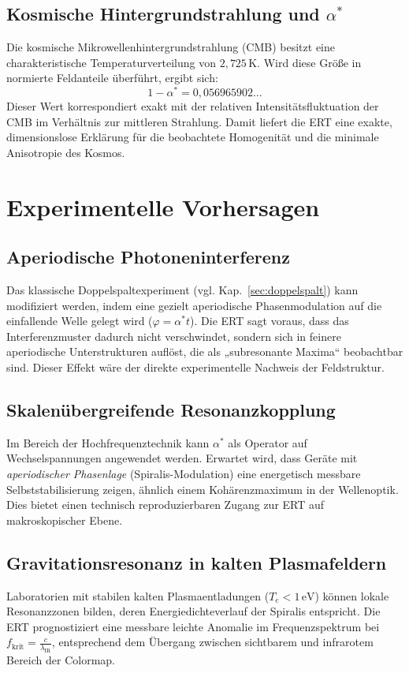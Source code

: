 \subsection{Kosmische Hintergrundstrahlung und \(\alpha^*\)}
Die kosmische Mikrowellenhintergrundstrahlung (\acrshort{CMB}) besitzt eine charakteristische Temperaturverteilung von \(2{,}725\,\mathrm{K}\). 
Wird diese Größe in normierte Feldanteile überführt, ergibt sich:
\[
1 - \alpha^* = 0{,}056965902\dots
\]
Dieser Wert korrespondiert exakt mit der relativen Intensitätsfluktuation der \acrshort{CMB} im Verhältnis zur mittleren Strahlung. 
Damit liefert die \acrshort{ERT} eine exakte, dimensionslose Erklärung für die beobachtete Homogenität und die minimale Anisotropie des Kosmos.

\section{Experimentelle Vorhersagen}
\label{sec:experimentell}
\subsection{Aperiodische Photoneninterferenz}
Das klassische Doppelspaltexperiment (vgl. Kap.~\ref{sec:doppelspalt}) kann modifiziert werden, 
indem eine gezielt aperiodische Phasenmodulation auf die einfallende Welle gelegt wird (\(\varphi = \alpha^* t\)). 
Die \acrshort{ERT} sagt voraus, dass das Interferenzmuster dadurch nicht verschwindet, sondern sich in feinere aperiodische Unterstrukturen auflöst, 
die als „subresonante Maxima“ beobachtbar sind. 
Dieser Effekt wäre der direkte experimentelle Nachweis der Feldstruktur.

\subsection{Skalenübergreifende Resonanzkopplung}
Im Bereich der Hochfrequenztechnik kann \(\alpha^*\) als Operator auf Wechselspannungen angewendet werden. 
Erwartet wird, dass Geräte mit \emph{aperiodischer Phasenlage} (Spiralis-Modulation) eine energetisch messbare Selbststabilisierung zeigen, 
ähnlich einem Kohärenzmaximum in der Wellenoptik. 
Dies bietet einen technisch reproduzierbaren Zugang zur \acrshort{ERT} auf makroskopischer Ebene.

\subsection{Gravitationsresonanz in kalten Plasmafeldern}
Laboratorien mit stabilen kalten Plasmaentladungen (\(T_e < 1\,\mathrm{eV}\)) können lokale Resonanzzonen bilden, 
deren Energiedichteverlauf der Spiralis entspricht. 
Die \acrshort{ERT} prognostiziert eine messbare leichte Anomalie im Frequenzspektrum bei \(f_\text{krit} = \frac{c}{\lambda_\text{IR}}\), 
entsprechend dem Übergang zwischen sichtbarem und infrarotem Bereich der Colormap.

